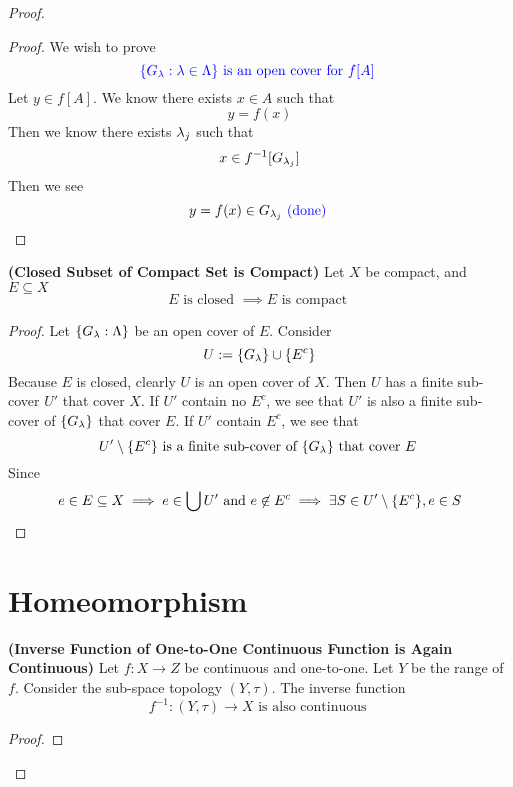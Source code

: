 \documentclass{report}
\begin{document}
\begin{proof}
\begin{proof}
We wish to prove
\begin{equation*}
\textcolor{blue}{\{ G_\lambda :\lambda \in \Lambda  \}\text{ is an open cover for $f[A]$ }}
\end{equation*}
Let $y\in f[A]$. We know there exists $x\in A$ such that 
\begin{equation*}
y=f(x)
\end{equation*}
Then we know there exists  $\lambda _j$ such that
\begin{equation*}
x\in f^{-1}[G_{\lambda _j}]
\end{equation*}
Then we see 
\begin{equation*}
y=f(x)\in G_{\lambda _j}\textcolor{blue}{\text{ (done) }}
\end{equation*}
\end{proof}
\begin{theorem}
\label{2.4.8}
\textbf{(Closed Subset of Compact Set is Compact)} Let $X$ be compact, and  $E\subseteq X$
\begin{equation*}
E\text{ is closed }\implies E\text{ is compact }
\end{equation*}
\end{theorem}
\begin{proof}
Let $\{ G_{\lambda }:\Lambda  \}$ be an open cover of $E$. Consider 
\begin{equation*}
U:=\{ G_{\lambda } \}\cup \{ E^c \}
\end{equation*}
Because $E$ is closed, clearly $U$ is an open cover of $X$. Then $U$ has a finite sub-cover $U'$ that cover $X$. If $U'$ contain no  $E^c$, we see that $U'$ is also a finite sub-cover of  $\{ G_\lambda \}$ that cover $E$. If $U'$ contain  $E^c$,  we see that 
\begin{equation*}
U'\setminus \{ E^c \}\text{ is a finite sub-cover of $\{ G_\lambda  \}$ that cover $E$ }
\end{equation*}
Since 
\begin{equation*}
e\in E\subseteq X\implies e\in \bigcup U'\text{ and }e\not \in E^c\implies \exists S\in U'\setminus \{ E^c \}, e\in S
\end{equation*}

\end{proof}
\section{Homeomorphism}
\begin{theorem}
\label{2.5.1}
\textbf{(Inverse Function of One-to-One Continuous Function is Again Continuous)} Let $f:X\rightarrow Z$ be continuous and one-to-one. Let $Y$ be the range of  $f$. Consider the sub-space topology  $(Y,\tau)$. The inverse function 
\begin{equation*}
f^{-1}:(Y,\tau)\rightarrow X\text{ is also continuous }
\end{equation*}
\end{theorem}
\begin{proof}
\end{proof}


\end{proof}
\end{document}
